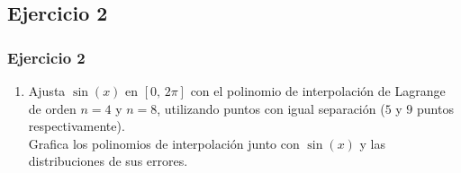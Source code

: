 \documentclass[12pt]{beamer}
\begin{document}
\subsection{Ejercicio 2}

\begin{frame}
\frametitle{Ejercicio 2}
\begin{enumerate}
\conti
\item Ajusta $\sin(x)$ en $[0, \, 2\pi]$ con el polinomio de interpolación de Lagrange de orden $n = 4$ y $n = 8$, utilizando puntos con igual separación ($5$ y $9$ puntos respectivamente). 
\\
\bigskip
Grafica los polinomios de interpolación junto con $\sin(x)$ y las distribuciones de sus errores.
\end{enumerate}
\end{frame}
\end{document}

